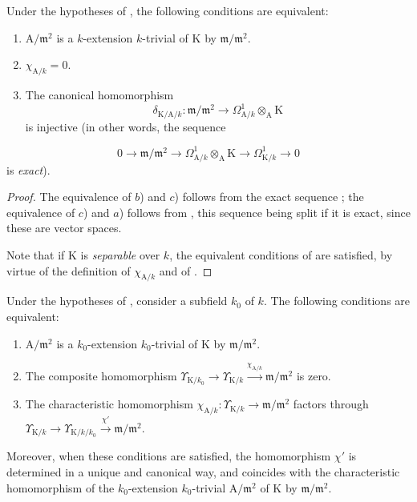 \begin{proposition}[22.2.9]
\label{0.22.2.9}
Under the hypotheses of , the following conditions are equivalent:
\begin{enumerate}
  \item[\textup{a)}] $\mathrm{A}/\mathfrak{m}^2$ is a $k$-extension $k$-trivial of $\mathrm{K}$ by $\mathfrak{m}/\mathfrak{m}^2$.
  \item[\textup{b)}] $\chi_{\mathrm{A}/k}=0$.
  \item[\textup{c)}] The canonical homomorphism 
  \[
    \delta_{\mathrm{K}/\mathrm{A}/k}:\mathfrak{m}/\mathfrak{m}^2\to\Omega^1_{\mathrm{A}/k}\otimes_\mathrm{A}\mathrm{K}
  \]
  is injective \textup{(in other words, the sequence}
\end{enumerate}
\[
\label{0.22.2.9.1}
  0\to\mathfrak{m}/\mathfrak{m}^2\to\Omega^1_{\mathrm{A}/k}\otimes_\mathrm{A}\mathrm{K}\to\Omega^1_{\mathrm{K}/k}\to 0
  \tag{22.2.9.1}
\]
\textup{is \emph{exact})}.
\end{proposition}

\begin{proof}
The equivalence of $b$) and $c$) follows from the exact sequence ; the equivalence of $c$) and $a$) follows from , this sequence being split if it is exact, since these are vector spaces.

Note that if $\mathrm{K}$ is \emph{separable} over $k$, the equivalent conditions of  are satisfied, by virtue of the definition of $\chi_{\mathrm{A}/k}$  and of .
\end{proof}

\begin{corollary}[22.2.10]
\label{0.22.2.10}
Under the hypotheses of , consider a subfield $k_0$ of $k$.
The following conditions are equivalent:
\begin{enumerate}
  \item[\textup{a)}] $\mathrm{A}/\mathfrak{m}^2$ is a $k_0$-extension $k_0$-trivial of $\mathrm{K}$ by $\mathfrak{m}/\mathfrak{m}^2$.
  \item[\textup{b)}] The composite homomorphism $\Upsilon_{\mathrm{K}/k_0}\to\Upsilon_{\mathrm{K}/k}\xrightarrow{\chi_{\mathrm{A}/k}}\mathfrak{m}/\mathfrak{m}^2$ is zero.
  \item[\textup{c)}] The characteristic homomorphism $\chi_{\mathrm{A}/k}:\Upsilon_{\mathrm{K}/k}\to\mathfrak{m}/\mathfrak{m}^2$ factors through $\Upsilon_{\mathrm{K}/k}\to\Upsilon_{\mathrm{K}/k/k_0}\xrightarrow{\chi'}\mathfrak{m}/\mathfrak{m}^2$.
\end{enumerate}
Moreover, when these conditions are satisfied, the homomorphism $\chi'$ is determined in a unique and canonical way, and coincides with the characteristic homomorphism of the $k_0$-extension $k_0$-trivial $\mathrm{A}/\mathfrak{m}^2$ of $\mathrm{K}$ by $\mathfrak{m}/\mathfrak{m}^2$.
\end{corollary}

